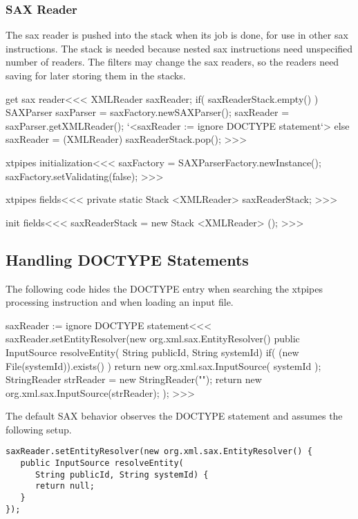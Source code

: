 \documentclass{article}
\begin{document}
{%
\subsubsection{SAX Reader}

The sax reader is pushed into the stack when its job is done, for
use in other sax instructions.  The stack is needed because nested sax
instructions need unspecified number of readers. The filters may
change the sax readers, so the readers need saving for later storing
them in the stacks.

\<get sax reader\><<<
XMLReader saxReader;
if( saxReaderStack.empty() ){
   SAXParser saxParser = saxFactory.newSAXParser();
   saxReader = saxParser.getXMLReader();
   `<saxReader := ignore DOCTYPE statement`>
} else {
   saxReader = (XMLReader) saxReaderStack.pop();
}
>>>




\<xtpipes initialization\><<<
saxFactory = SAXParserFactory.newInstance();
saxFactory.setValidating(false);
>>>

\<xtpipes fields\><<<
private static Stack <XMLReader> saxReaderStack;
>>>


\<init fields\><<<
saxReaderStack = new Stack <XMLReader> ();
>>>

\subsection{Handling DOCTYPE Statements}


The following code hides the DOCTYPE entry when searching the xtpipes
processing instruction and when loading an input file.

\<saxReader := ignore DOCTYPE statement\><<<
saxReader.setEntityResolver(new org.xml.sax.EntityResolver() {
   public InputSource resolveEntity(
                          String publicId, String systemId) {
     if( (new File(systemId)).exists() ){
        return new org.xml.sax.InputSource( systemId );
      }
      StringReader strReader = new StringReader("");
      return new org.xml.sax.InputSource(strReader);
   }
});
>>>

The default SAX behavior observes the DOCTYPE statement and assumes
the following setup.

\begin{verbatim}
saxReader.setEntityResolver(new org.xml.sax.EntityResolver() {
   public InputSource resolveEntity(
      String publicId, String systemId) {
      return null;
   }
});
\end{verbatim}




}
\end{document}
